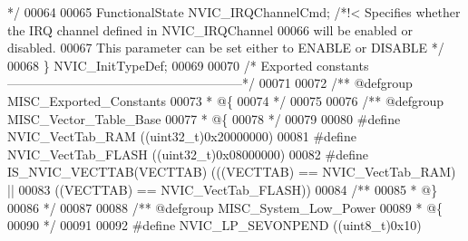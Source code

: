 \begin{DoxyCode}
{       */}
00064 
00065   FunctionalState NVIC_IRQChannelCmd;         \textcolor{comment}{/*!< Specifies whether the IRQ channel defined in
       NVIC\_IRQChannel}
00066 \textcolor{comment}{                                                   will be enabled or disabled. }
00067 \textcolor{comment}{                                                   This parameter can be set either to ENABLE or
       DISABLE */}
00068 \} NVIC\_InitTypeDef;
00069 
00070 \textcolor{comment}{/* Exported constants --------------------------------------------------------*/}
00071 
00072 \textcolor{comment}{/** @defgroup MISC\_Exported\_Constants}
00073 \textcolor{comment}{  * @\{}
00074 \textcolor{comment}{  */}
00075 
00076 \textcolor{comment}{/** @defgroup MISC\_Vector\_Table\_Base }
00077 \textcolor{comment}{  * @\{}
00078 \textcolor{comment}{  */}
00079 
00080 \textcolor{preprocessor}{#}\textcolor{preprocessor}{define} \textcolor{preprocessor}{NVIC\_VectTab\_RAM}             \textcolor{preprocessor}{(}\textcolor{preprocessor}{(}\textcolor{preprocessor}{uint32\_t}\textcolor{preprocessor}{)}0x20000000\textcolor{preprocessor}{)}
00081 \textcolor{preprocessor}{#}\textcolor{preprocessor}{define} \textcolor{preprocessor}{NVIC\_VectTab\_FLASH}           \textcolor{preprocessor}{(}\textcolor{preprocessor}{(}\textcolor{preprocessor}{uint32\_t}\textcolor{preprocessor}{)}0x08000000\textcolor{preprocessor}{)}
00082 \textcolor{preprocessor}{#}\textcolor{preprocessor}{define} \textcolor{preprocessor}{IS\_NVIC\_VECTTAB}\textcolor{preprocessor}{(}\textcolor{preprocessor}{VECTTAB}\textcolor{preprocessor}{)} \textcolor{preprocessor}{(}\textcolor{preprocessor}{(}\textcolor{preprocessor}{(}\textcolor{preprocessor}{VECTTAB}\textcolor{preprocessor}{)} \textcolor{preprocessor}{==} NVIC_VectTab_RAM\textcolor{preprocessor}{)} \textcolor{preprocessor}{||}
00083                                   \textcolor{preprocessor}{(}\textcolor{preprocessor}{(}\textcolor{preprocessor}{VECTTAB}\textcolor{preprocessor}{)} \textcolor{preprocessor}{==} NVIC_VectTab_FLASH\textcolor{preprocessor}{)}\textcolor{preprocessor}{)}
00084 \textcolor{comment}{/**}
00085 \textcolor{comment}{  * @\}}
00086 \textcolor{comment}{  */}
00087 
00088 \textcolor{comment}{/** @defgroup MISC\_System\_Low\_Power }
00089 \textcolor{comment}{  * @\{}
00090 \textcolor{comment}{  */}
00091 
00092 \textcolor{preprocessor}{#}\textcolor{preprocessor}{define} \textcolor{preprocessor}{NVIC\_LP\_SEVONPEND}            \textcolor{preprocessor}{(}\textcolor{preprocessor}{(}\textcolor{preprocessor}{uint8\_t}\textcolor{preprocessor}{)}0x10\textcolor{preprocessor}{)}

\end{DoxyCode}
